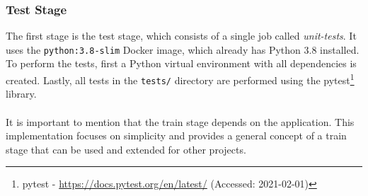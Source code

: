 \subsubsection{Test Stage}
The first stage is the test stage, which consists of a single job called \textit{unit-tests}.
It uses the \texttt{python:3.8-slim} Docker image, which already has Python 3.8 installed. To perform the tests, first a Python virtual environment with all dependencies is created. Lastly, all tests in the \texttt{tests/} directory are performed using the pytest\footnote{pytest - \url{https://docs.pytest.org/en/latest/} (Accessed: 2021-02-01)} library.


\paragraph{}
It is important to mention that the train stage depends on the application. This implementation focuses on simplicity and provides a general concept of a train stage that can be used and extended for other projects.


